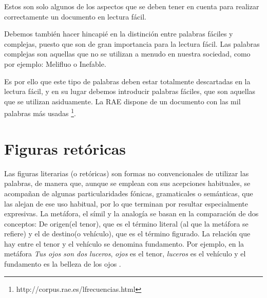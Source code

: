 Estos son solo algunos de los aspectos que se deben tener en cuenta para realizar correctamente un documento en lectura fácil.

Debemos también hacer hincapié en la distinción entre palabras fáciles y complejas, puesto que son de gran importancia para la lectura fácil. 
Las palabras complejas son aquellas que no se utilizan a menudo en nuestra sociedad, como por ejemplo: Melifluo o Inefable.

Es por ello que este tipo de palabras deben estar totalmente descartadas en la lectura fácil, y en su lugar debemos introducir palabras fáciles, que son aquellas que se utilizan asiduamente. La RAE dispone de un documento con las mil palabras más usadas \footnote{http://corpus.rae.es/lfrecuencias.html}.




\section{Figuras retóricas}
\label{cap:sec:figurasretoricas}

Las figuras literarias (o retóricas) son formas no convencionales de utilizar las palabras, de manera que, aunque se emplean con sus acepciones habituales, se acompañan de algunas particularidades fónicas, gramaticales o semánticas, que las alejan de ese uso habitual, por lo que terminan por resultar especialmente expresivas. 
La metáfora, el símil y la analogía se basan en la comparación de dos conceptos: De origen(el tenor), que es el término literal (al que la metáfora se refiere) y el de destino(o vehículo), que es el término figurado. La relación que hay entre el tenor y el vehículo se denomina fundamento. Por ejemplo, en la metáfora \textit{Tus ojos son dos luceros}, \textit{ojos} es el tenor, \textit{luceros} es el vehículo y el fundamento es la belleza de los ojos \citep{GalianaYCasas1994}.


